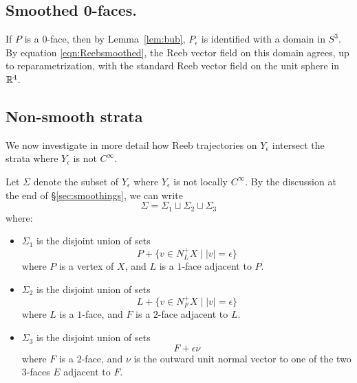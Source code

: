 \subsection*{Smoothed 0-faces.} If $P$ is a $0$-face, then by Lemma~\ref{lem:bub}, $P_\epsilon$ is identified with a domain in $S^3$. By equation \eqref{eqn:Reebsmoothed}, the Reeb vector field on this domain agrees, up to reparametrization, with the standard Reeb vector field on the unit sphere in ${\mathbb R}^4$.

\subsection{Non-smooth strata}
\label{sec:nss}

We now investigate in more detail how Reeb trajectories on $Y_\epsilon$ intersect the strata where $Y_\epsilon$ is not $C^\infty$.

Let $\Sigma$ denote the subset of $Y_\epsilon$ where $Y_\epsilon$ is not locally $C^\infty$. By the discussion at the end of \S\ref{sec:smoothings}, we can write
\[
\Sigma = \Sigma_1 \sqcup \Sigma_2 \sqcup \Sigma_3
\]
where:

\begin{itemize}
\item
$\Sigma_1$ is the disjoint union of sets
\begin{equation}
\label{eqn:Sigma1}
P+\{v\in N_L^+X\mid |v|=\epsilon\}
\end{equation}
where $P$ is a vertex of $X$, and $L$ is a $1$-face adjacent to $P$.
\item
$\Sigma_2$ is the disjoint union of sets
\begin{equation}
\label{eqn:Sigma2}
L+\{v\in N_F^+X\mid |v|=\epsilon\}
\end{equation}
where $L$ is a $1$-face, and $F$ is a $2$-face adjacent to $L$.
\item
$\Sigma_3$ is the disjoint union of sets
\[
F+\epsilon\nu
\]
where $F$ is a $2$-face, and $\nu$ is the outward unit normal vector to one of the two $3$-faces $E$ adjacent to $F$.
\end{itemize}

